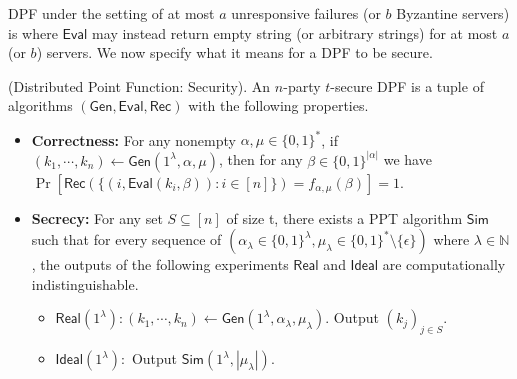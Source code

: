 \documentclass[11pt]{article}
\newcommand{\Gen}{\textsf{Gen}}
\newcommand{\Eval}{\textsf{Eval}}
\newcommand{\Rec}{\textsf{Rec}}
\newcommand{\Sim}{\textsf{Sim}}
\newcommand{\Real}{\textsf{Real}}
\newcommand{\Ideal}{\textsf{Ideal}}
\begin{document}
DPF under the setting of at most $a$ unresponsive failures (or $b$ Byzantine servers) is where $\Eval$ may instead return empty string (or arbitrary strings) for at most $a$ (or $b$) servers. We now specify what it means for a DPF to be secure.
\begin{definition}
(Distributed Point Function: Security). An $n$-party $t$-secure DPF is a tuple of algorithms $(\Gen, \Eval, \Rec)$ with the following properties.
\begin{itemize}
\item \textbf{Correctness:} For any nonempty $\alpha, \mu \in \{0,1\}^{*}$, if $(k_1, \cdots, k_n) \leftarrow \Gen(1^{\lambda}, \alpha, \mu)$, then for any $\beta \in \{0,1\}^{|\alpha|}$ we have $\Pr[\Rec(\{(i,\Eval(k_i, \beta)): i \in [n]\}) = f_{\alpha, \mu}(\beta)] = 1$.
\item \textbf{Secrecy:} For any set $S \subseteq [n]$ of size t, there exists a PPT algorithm $\Sim$ such that for every sequence of $(\alpha_\lambda \in \{0,1\}^\lambda, \mu_\lambda \in \{0,1\}^* \setminus \{\epsilon\})$ where $\lambda \in \mathbb{N}$, the outputs of the following experiments $\Real$ and $\Ideal$ are computationally indistinguishable.
\begin{itemize}
  \item $\Real(1^{\lambda}): (k_1, \cdots, k_n) \leftarrow \Gen(1^{\lambda}, \alpha_\lambda, \mu_\lambda)$. Output $(k_j)_{j \in S}$.
  \item $\Ideal(1^{\lambda}):$ Output $\Sim(1^{\lambda}, |\mu_\lambda|)$.
\end{itemize}
\end{itemize}
\end{definition}
\end{document}
